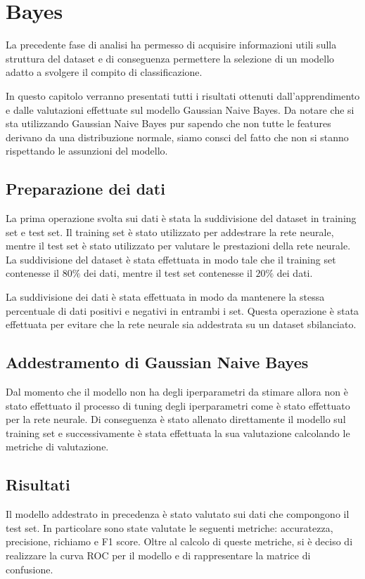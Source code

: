 \chapter{Bayes} \label{chp:bayes}
La precedente fase di analisi ha permesso di acquisire informazioni utili sulla
struttura del dataset e di conseguenza permettere la selezione di un modello
adatto a svolgere il compito di classificazione.

In questo capitolo verranno presentati tutti i risultati ottenuti dall'apprendimento
e dalle valutazioni effettuate sul modello Gaussian Naive Bayes. Da notare che 
si sta utilizzando Gaussian Naive Bayes pur sapendo che non tutte le features 
derivano da una distribuzione normale, siamo consci del fatto che non si stanno 
rispettando le assunzioni del modello.

\section{Preparazione dei dati}
La prima operazione svolta sui dati è stata la suddivisione del dataset in
training set e test set. Il training set è stato utilizzato per addestrare la
rete neurale, mentre il test set è stato utilizzato per valutare le prestazioni
della rete neurale. La suddivisione del dataset è stata effettuata in modo tale
che il training set contenesse il $80\%$ dei dati, mentre il test set contenesse
il $20\%$ dei dati.

La suddivisione dei dati è stata effettuata in modo da mantenere la stessa 
percentuale di dati positivi e negativi in entrambi i set. Questa operazione è
stata effettuata per evitare che la rete neurale sia addestrata su un dataset
sbilanciato.

\section{Addestramento di Gaussian Naive Bayes}
Dal momento che il modello non ha degli iperparametri da stimare allora non è 
stato effettuato il processo di tuning degli iperparametri come è stato effettuato
per la rete neurale. Di conseguenza è stato allenato direttamente il modello sul
training set e successivamente è stata effettuata la sua valutazione calcolando 
le metriche di valutazione.

\section{Risultati}
Il modello addestrato in precedenza è stato valutato sui dati che compongono il
test set. In particolare sono state valutate le seguenti metriche: accuratezza,
precisione, richiamo e F1 score. Oltre al calcolo di queste metriche, si è 
deciso di realizzare la curva ROC per il modello e di rappresentare la matrice
di confusione.

